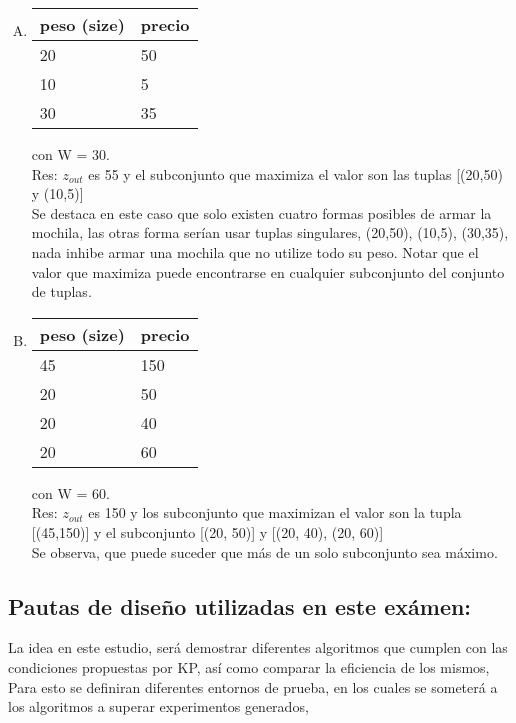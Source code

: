 \documentclass[fleqn, 11pt]{article}
\begin{document}
\begin{enumerate}[A.]

\item
\begin{tabular}{l l}
	peso (size) & precio \\ \toprule
    20 & 50 \\
    10 & 5  \\
    30 & 35  \\
\end{tabular}
con W = 30. \\

Res: $z_{out}$ es 55 y el subconjunto que maximiza el valor son las tuplas [(20,50) y (10,5)] \\

Se destaca en este caso que solo existen cuatro formas posibles de armar la mochila,
las otras forma serían usar tuplas singulares, (20,50), (10,5), (30,35), nada inhibe armar una mochila que no utilize todo su peso. Notar que el valor que maximiza puede encontrarse en cualquier subconjunto del conjunto de tuplas.



\item
\begin{tabular}{l l}
	peso (size) & precio \\ \toprule
    45 & 150 \\
    20 & 50 \\
    20  & 40 \\
    20 & 60


\end{tabular}
con W = 60. \\

Res: $z_{out}$ es 150 y los subconjunto que maximizan el valor son la tupla [(45,150)] y el subconjunto
[(20, 50)] y [(20, 40), (20, 60)] \\

Se observa, que puede suceder que más de un solo subconjunto sea máximo.

\end{enumerate}

\subsection{Pautas de diseño utilizadas en este exámen:}

La idea en este estudio, será demostrar diferentes algoritmos que cumplen con las condiciones propuestas por KP, así como comparar la eficiencia de los mismos, Para esto se definiran diferentes entornos de prueba, en los cuales se someterá a los algoritmos a superar experimentos generados, \\
\end{document}
